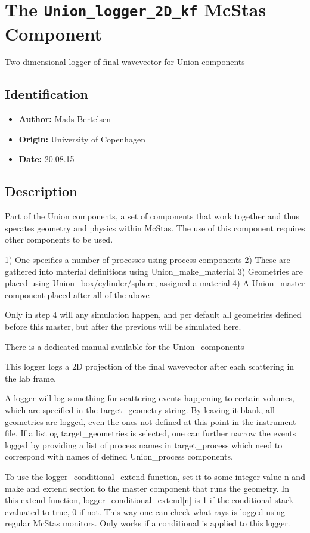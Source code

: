 \section{The \texttt{Union\_logger\_2D\_kf} McStas Component}
Two dimensional logger of final wavevector for Union components

\subsection*{Identification}
\begin{itemize}
  \item \textbf{Author:} Mads Bertelsen
  \item \textbf{Origin:} University of Copenhagen
  \item \textbf{Date:} 20.08.15
\end{itemize}

\subsection*{Description}
Part of the Union components, a set of components that work together and thus sperates geometry and physics within McStas. The use of this component requires other components to be used.

1) One specifies a number of processes using process components 2) These are gathered into material definitions using Union\_make\_material 3) Geometries are placed using Union\_box/cylinder/sphere, assigned a material 4) A Union\_master component placed after all of the above

Only in step 4 will any simulation happen, and per default all geometries defined before this master, but after the previous will be simulated here.

There is a dedicated manual available for the Union\_components

This logger logs a 2D projection of the final wavevector after each scattering in the lab frame.

A logger will log something for scattering events happening to certain volumes, which are specified in the target\_geometry string. By leaving it blank, all geometries are logged, even the ones not defined at this point in the instrument file. If a list og target\_geometries is selected, one can further narrow the events logged by providing a list of process names in target\_process which need to correspond with names of defined Union\_process components.

To use the logger\_conditional\_extend function, set it to some integer value n and make and extend section to the master component that runs the geometry. In this extend function, logger\_conditional\_extend[n] is 1 if the conditional stack evaluated to true, 0 if not. This way one can check what rays is logged using regular McStas monitors. Only works if a conditional is applied to this logger.

